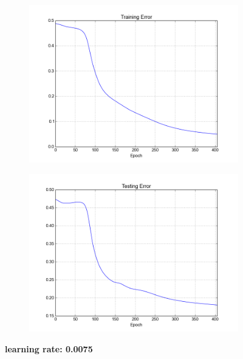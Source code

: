 \begin{figure}[h]	
	\begin{subfigure}[b]{0.5\textwidth}
		\includegraphics[width=\linewidth]{fig/trainingerror_lr0,0075_eps0,05_regparam0,00_beta5_batch1.png}
	\end{subfigure}
	\begin{subfigure}[b]{0.5\textwidth}
		\includegraphics[width=\linewidth]{fig/valerror_lr0,0075_eps0,05_regparam0,00_beta5_batch1.png}
	\end{subfigure}

	\caption{\textbf{learning rate: 0.0075}}
\end{figure}


